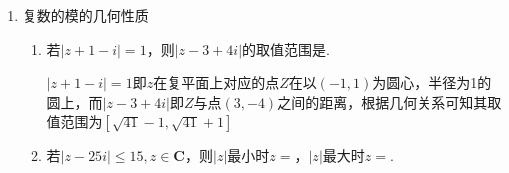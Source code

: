 \begin{enumerate}
\begin{enumerate}
    \begin{jieda}
        $|z - 4i| = |z+2|$即$|z - 4i|^2 = |z+2|^2$，即$(z-4i)(\overline{z} + 4i) = (z+2)(\overline{z}-2)$ \\
        代入$z = x + yi$得到$x^2+(y-4)^2 = (x+2)^2 + y^2$，化简有$x+2y = 3$ \\
        故$2^x + 4^y = 2^x + 2^{2y} = 2^x + 2^{3-x} \geq 4\sqrt{2}$（当$x = \dfrac{3}{2}, y = \dfrac{3}{4}$时取等.）
    \end{jieda}    
    \item 已知复数$|z_1| = |z_2| = |z_3| = \sqrt{2}$，则$\dfrac{|z_1 + z_2 + z_3|}{\left | \dfrac{1}{z_1} + \dfrac{1}{z_2} + \dfrac{1}{z_3}\right|} = $
    \begin{jieda}
        因为$\dfrac{1}{z} = \dfrac{\overline{z}}{|z|^2}$，所以$\dfrac{1}{z_1} = \dfrac{\overline{z_1}}{2}, \dfrac{1}{z_2} = \dfrac{\overline{z_2}}{2}, \dfrac{1}{z_3} = \dfrac{\overline{z_3}}{2}$，\\
        故$\dfrac{|z_1 + z_2 + z_3|}{\left | \dfrac{1}{z_1} + \dfrac{1}{z_2} + \dfrac{1}{z_3}\right|} = 2\dfrac{|z_1 + z_2 + z_3|}{|\overline{z_1} + \overline{z_2} + \overline{z_3}|} = 2\dfrac{|z_1 + z_2 + z_3|}{|\overline{z_1+z_2+z_3}|} = 2$
    \end{jieda}
    \item 已知复数$z_1 = 1 + icos\theta, z_2 = sin\theta - i$，则$|z_1 - z_2|$的最大值为
    \begin{jieda}
        $z_1 - z_2 = (1-sin\theta) + i (cos\theta-1)$，故$|z_1 - z_2| = \sqrt{1 + sin^2\theta - 2sin\theta + cos^2\theta + 1 - 2cos\theta} = \sqrt{3 - 2(sin\theta+cos\theta)} \leq \sqrt{3 + 2\sqrt{2}} = 1+\sqrt{2}$
    \end{jieda}
\end{enumerate}
\item 复数的模的几何性质
\begin{enumerate}
    \item 若$|z + 1 - i| = 1$，则$|z - 3 + 4i|$的取值范围是.
    \begin{jieda}
        $|z + 1 - i| = 1$即$z$在复平面上对应的点$Z$在以$(-1, 1)$为圆心，半径为1的圆上，而$|z - 3 + 4i|$即$Z$与点$(3, -4)$之间的距离，根据几何关系可知其取值范围为$[\sqrt{41}-1, \sqrt{41}+1]$
    \end{jieda}
    \item 若$|z - 25i| \leq 15, z \in \mathbf{C}$，则$|z|$最小时$z = $，$|z|$最大时$z = $.
    \begin{jieda}

\end{jieda}
\end{enumerate}
\end{enumerate}
